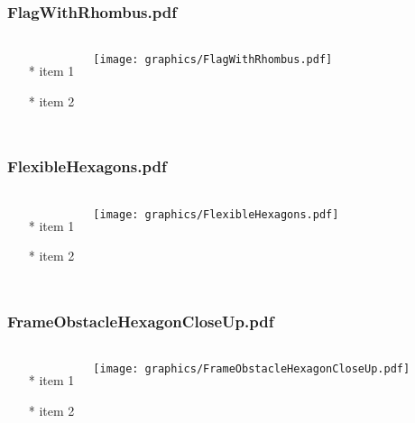 \begin{frame} \frametitle{FlagWithRhombus.pdf}
    \begin{columns}[c]
        \begin{itemize}
            \item[*] item 1
            \item[*] item 2
        \end{itemize}
        \begin{minipage}{\linewidth}
            \begin{center}
            \texttt{[image: graphics/FlagWithRhombus.pdf]}
            \label{gfx:FlagWithRhombus.pdf}
            \end{center}
        \end{minipage}
    \end{columns}
\end{frame}
\begin{frame} \frametitle{FlexibleHexagons.pdf}
    \begin{columns}[c]
        \begin{itemize}
            \item[*] item 1
            \item[*] item 2
        \end{itemize}
        \begin{minipage}{\linewidth}
            \begin{center}
            \texttt{[image: graphics/FlexibleHexagons.pdf]}
            \label{gfx:FlexibleHexagons.pdf}
            \end{center}
        \end{minipage}
    \end{columns}
\end{frame}
\begin{frame} \frametitle{FrameObstacleHexagonCloseUp.pdf}
    \begin{columns}[c]
        \begin{itemize}
            \item[*] item 1
            \item[*] item 2
        \end{itemize}
        \begin{minipage}{\linewidth}
            \begin{center}
            \texttt{[image: graphics/FrameObstacleHexagonCloseUp.pdf]}
            \label{gfx:FrameObstacleHexagonCloseUp.pdf}
            \end{center}
        \end{minipage}
    \end{columns}
\end{frame}
